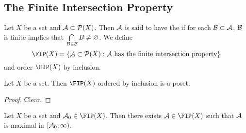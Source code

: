 \documentclass{book}
\begin{document}
	
	
	
	
	
	
	
	
	
	
	
	
	
	
	
	
		

	






















	\subsection{The Finite Intersection Property} 
	
	\begin{defn}
		Let $X$ be a set and $\mathcal{A} \subset \mathcal{P}(X)$. Then $\mathcal{A}$ is said to have the  if for each $\mathcal{B} \subset \mathcal{A}$, $\mathcal{B}$ is finite implies that $\bigcap\limits_{B \in \mathcal{B}} B \neq \varnothing$. We define 
		$$\FIP(X) = \{\MA \subset \MP(X): \MA \text{ has the finite intersection property} \}$$ 
		and order $\FIP(X)$ by inclusion. 
	\end{defn}

	\begin{ex}
		Let $X$ be a set. Then $\FIP(X)$ ordered by inclusion is a poset.
	\end{ex}

	\begin{proof}
		Clear.
	\end{proof}

	\begin{ex}
		Let $X$ be a set and $\MA_0 \in \FIP(X)$. Then there exists $\MA \in \FIP(X)$ such that $\mathcal{A}$ is maximal in $[\mathcal{A}_0, \infty)$. 
	\end{ex}
\end{document}
